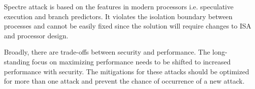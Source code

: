 \documentclass[a4paper,12pt, final]{report}
\begin{document}
Spectre attack is based on the features in modern processors i.e. speculative execution and branch predictors. It violates the isolation boundary between processes and cannot be easily fixed since the solution will require changes to ISA and processor design.

Broadly, there are trade-offs between security and performance. The long-standing focus on maximizing performance needs to be shifted to increased performance with security. The mitigations for these attacks should be optimized for more than one attack and prevent the chance of occurrence of a new attack.


{}
\end{document}
